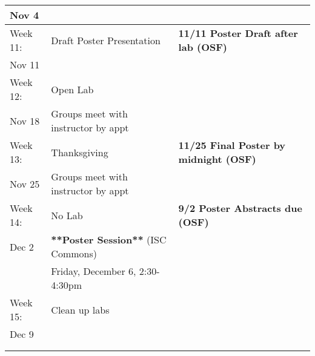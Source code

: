 \documentclass{tufte-handout}
\begin{document}
\begin{tabular}{l l l}
Nov 4 &  & \\
\hline
Week 11: & Draft Poster Presentation & \textbf{11/11 Poster Draft after lab (OSF)}\\
Nov 11 \\
\hline
Week 12: & Open Lab &  \\
Nov 18 & Groups meet with instructor by appt  \\
\hline
Week 13: & Thanksgiving & \textbf{11/25 Final Poster by midnight (OSF)}\\
Nov 25 &  Groups meet with instructor by appt \\
\hline
Week 14: & No Lab & \textbf{9/2 Poster Abstracts due (OSF)}  \\
Dec 2 & \textbf{**Poster Session**} (ISC Commons) &\\
& Friday, December 6, 2:30-4:30pm \\
\hline 
Week 15: & Clean up labs & \\
Dec 9 &  \\
 &  \\
\hline
\\
\end{tabular}
\end{document}
